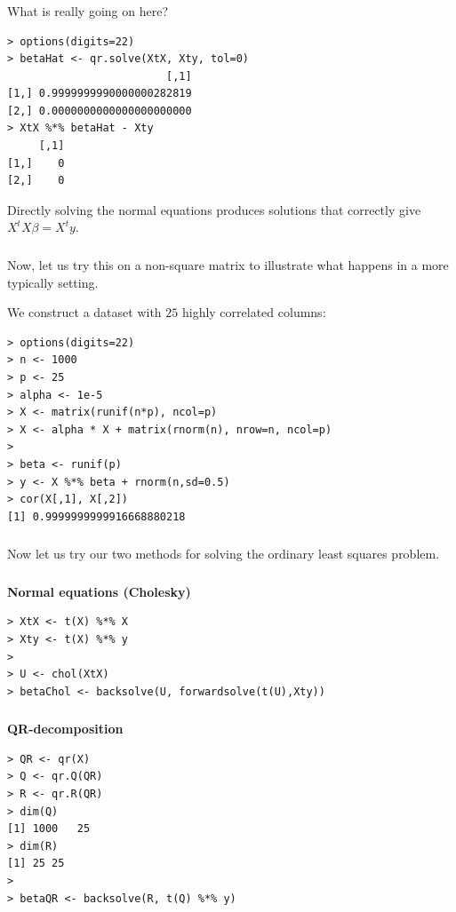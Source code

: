 \begin{frame}[fragile] \frametitle{}

What is really going on here?
\begin{verbatim}
> options(digits=22)
> betaHat <- qr.solve(XtX, Xty, tol=0)
                         [,1]
[1,] 0.9999999990000000282819
[2,] 0.0000000000000000000000
> XtX %*% betaHat - Xty
     [,1]
[1,]    0
[2,]    0
\end{verbatim}
\pause Directly solving the normal equations produces
solutions that correctly give $X^tX \beta = X^ty$.

\end{frame}

\begin{frame}[fragile] \frametitle{}

Now, let us try this on a non-square matrix to illustrate
what happens in a more typically setting.

\pause We construct a dataset with $25$ highly correlated
columns:
\begin{verbatim}
> options(digits=22)
> n <- 1000
> p <- 25
> alpha <- 1e-5
> X <- matrix(runif(n*p), ncol=p)
> X <- alpha * X + matrix(rnorm(n), nrow=n, ncol=p)
>
> beta <- runif(p)
> y <- X %*% beta + rnorm(n,sd=0.5)
> cor(X[,1], X[,2])
[1] 0.9999999999916668880218
\end{verbatim}

\end{frame}

\begin{frame}[fragile] \frametitle{}

Now let us try our two methods for solving the ordinary
least squares problem.
\end{frame}

\begin{frame}[fragile] \frametitle{}

{\bf Normal equations (Cholesky)}
\begin{verbatim}
> XtX <- t(X) %*% X
> Xty <- t(X) %*% y
>
> U <- chol(XtX)
> betaChol <- backsolve(U, forwardsolve(t(U),Xty))
\end{verbatim}

\end{frame}

\begin{frame}[fragile] \frametitle{}

{\bf QR-decomposition}

\begin{verbatim}
> QR <- qr(X)
> Q <- qr.Q(QR)
> R <- qr.R(QR)
> dim(Q)
[1] 1000   25
> dim(R)
[1] 25 25
>
> betaQR <- backsolve(R, t(Q) %*% y)
\end{verbatim}

\end{frame}

